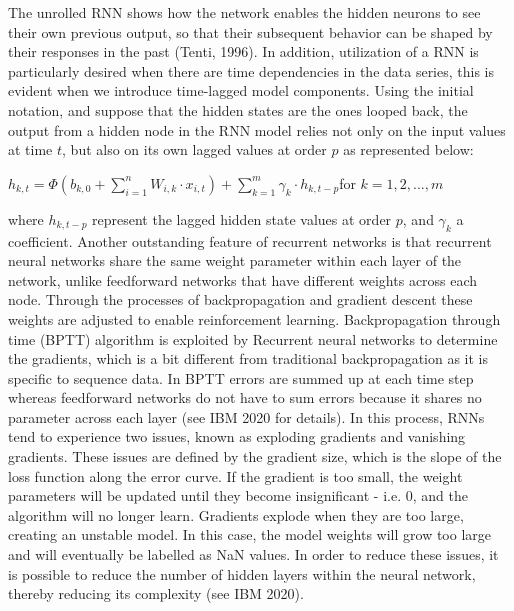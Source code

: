 \documentclass[a4paper,11pt,oneside]{book}
\begin{document}
The unrolled RNN shows how the network enables the hidden neurons to see their
own previous output, so that their subsequent behavior can be shaped by their responses in the past (Tenti, 1996). In addition, utilization of a RNN is particularly desired when there are
time dependencies in the data series, this is evident when we introduce time-lagged model components. Using the initial notation, and suppose that the hidden states are the ones looped
back, the output from a hidden node in the RNN model relies not only on the input values at
time $t$, but also on its own lagged values at order $p$ as represented below:

\begin{center}
	$h_{k,t} =\Phi(b_{k,0} + \sum_{i=1}^{n} W_{i,k} \cdot x_{i,t}) + \sum_{k=1}^{m} \gamma_{k} \cdot h_{k,t-p}$for $k = 1,2,...,m$
\end{center}

where $h_{k,t-p}$ represent the lagged hidden state values at order $p$, and $\gamma_{k}$ a coefficient. Another outstanding feature of recurrent networks is that recurrent neural networks share the same weight parameter within each layer of the network, unlike feedforward networks that have different weights across each node. Through the processes of backpropagation and gradient descent these weights are adjusted to enable reinforcement learning.  Backpropagation through time (BPTT) algorithm is exploited by Recurrent neural networks to determine the gradients, which is a bit different from traditional backpropagation as it is specific to sequence data. In BPTT errors are summed up at each time step whereas feedforward networks do not have to sum errors because it shares no parameter across each layer (see IBM 2020 for details).\newline\newline
In this process, RNNs tend to experience two issues, known as exploding gradients and vanishing gradients. These issues are defined by the gradient size, which is the slope of the loss function along the error curve. If the gradient is too small, the weight parameters will be updated until they become insignificant - i.e. 0, and the algorithm will no longer learn. Gradients explode when they are too large, creating an unstable model. In this case, the model weights will grow too large and will eventually be labelled as NaN values. In order to reduce these issues, it is possible to reduce the number of hidden layers within the neural network, thereby reducing its complexity (see IBM 2020).
\end{document}
